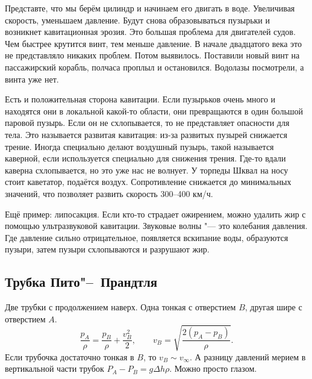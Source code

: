 Представте, что мы берём цилиндр и начинаем его двигать в воде. Увеличивая скорость, уменьшаем давление. Будут снова образовываться пузырьки и возникнет кавитационная эрозия. Это большая проблема для двигателей судов. Чем быстрее крутится винт, тем меньше давление. В начале двадцатого века это не представляло никаких проблем. Потом выявилось. Поставили новый винт на пассажирский корабль, полчаса проплыл и остановился. Водолазы посмотрели, а винта уже нет.

Есть и положительная сторона кавитации. Если пузырьков очень много и находятся они в локальной какой-то области, они превращаются в один большой паровой пузырь. Если он не схлопывается, то не представляет опасности для тела. Это называется развитая кавитация: из-за развитых пузырей снижается трение. Иногда специально делают воздушный пузырь, такой называется каверной, если используется специально для снижения трения. Где-то вдали каверна схлопывается, но это уже нас не волнует.
У торпеды Шквал на носу стоит каветатор, подаётся воздух. Сопротивление снижается до минимальных значений, что позволяет развить скорость 300--400 км/ч.

Ещё пример: липосакция. Если кто-то страдает ожирением, можно удалить жир с помощью ультразвуковой кавитации. Звуковые волны "--- это колебания давления. Где давление сильно отрицательное, появляется вскипание воды, образуются пузыри, затем пузыри схлопываются и разрушают жир.

\subsection{Трубка Пито"--~Прандтля}

Две трубки с продолжением наверх. Одна тонкая с отверстием $B$, другая шире с отверстием $A$.
\[\frac{p_A}\rho = \frac{p_B}\rho+\frac{v_B^2}2,\qquad v_B=\sqrt{\frac{2(p_A-p_B)}{\rho}}.\]
Если трубочка достаточно тонкая в $B$, то $v_B\sim v_\infty$. А разницу давлений мерием в вертикальной части трубок $P_A-P_B = g\Delta h\rho$. Можно просто глазом.

